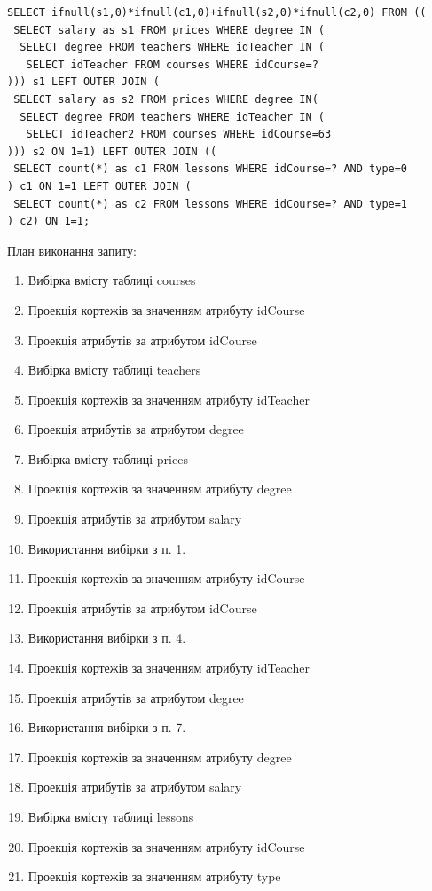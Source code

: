 { \fontsize{11pt}{12pt} \selectfont
\begin{verbatim}
SELECT ifnull(s1,0)*ifnull(c1,0)+ifnull(s2,0)*ifnull(c2,0) FROM ((
 SELECT salary as s1 FROM prices WHERE degree IN (
  SELECT degree FROM teachers WHERE idTeacher IN (
   SELECT idTeacher FROM courses WHERE idCourse=?
))) s1 LEFT OUTER JOIN (
 SELECT salary as s2 FROM prices WHERE degree IN(
  SELECT degree FROM teachers WHERE idTeacher IN (
   SELECT idTeacher2 FROM courses WHERE idCourse=63
))) s2 ON 1=1) LEFT OUTER JOIN ((
 SELECT count(*) as c1 FROM lessons WHERE idCourse=? AND type=0
) c1 ON 1=1 LEFT OUTER JOIN (
 SELECT count(*) as c2 FROM lessons WHERE idCourse=? AND type=1
) c2) ON 1=1;
\end{verbatim}
}

\FloatBarrier
План виконання запиту:
\begin{enumerate}
\item Вибірка вмісту таблиці courses
\item Проекція кортежів за значенням атрибуту idCourse
\item Проекція атрибутів за атрибутом idCourse
\item Вибірка вмісту таблиці teachers
\item Проекція кортежів за значенням атрибуту idTeacher
\item Проекція атрибутів за атрибутом degree
\item Вибірка вмісту таблиці prices
\item Проекція кортежів за значенням атрибуту degree
\item Проекція атрибутів за атрибутом salary
\item Використання вибірки з п. 1.
\item Проекція кортежів за значенням атрибуту idCourse
\item Проекція атрибутів за атрибутом idCourse
\item Використання вибірки з п. 4.
\item Проекція кортежів за значенням атрибуту idTeacher
\item Проекція атрибутів за атрибутом degree
\item Використання вибірки з п. 7.
\item Проекція кортежів за значенням атрибуту degree
\item Проекція атрибутів за атрибутом salary
\item Вибірка вмісту таблиці lessons
\item Проекція кортежів за значенням атрибуту idCourse
\item Проекція кортежів за значенням атрибуту type

\end{enumerate}
